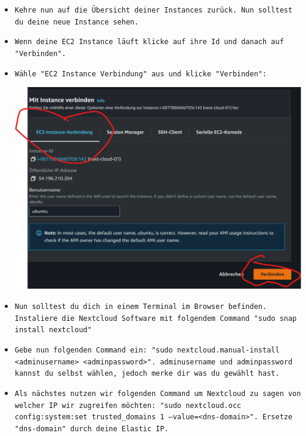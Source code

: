 \documentclass{article}
\begin{document}
\begin{itemize}
\item \texttt{Kehre nun auf die Übersicht deiner Instances zurück. Nun solltest du deine neue Instance sehen.} \\

\item \texttt{Wenn deine EC2 Instance läuft klicke auf ihre Id und danach auf "Verbinden".} \\

\item \texttt{Wähle "EC2 Instance Verbindung" aus und klicke "Verbinden":
} \\

\begin{center}
    \includegraphics[width=13cm]{images/nextcloud_3.png}
\end{center}

\item \texttt{Nun solltest du dich in einem Terminal im Browser befinden. Instaliere die Nextcloud Software mit folgendem Command "sudo snap install nextcloud"} \\

\item \texttt{Gebe nun folgenden Command ein: "sudo nextcloud.manual-install <adminusername> <adminpassword>". adminusername und adminpassword kannst du selbst wählen, jedoch merke dir was du gewählt hast.} \\

\item \texttt{Als nächstes nutzen wir folgenden Command um Nextcloud zu sagen von welcher IP wir zugreifen möchten: "sudo nextcloud.occ \\config:system:set trusted\_domains 1 --value=<dns-domain>". Ersetze "dns-domain" durch deine Elastic IP.} \\


\end{itemize}
\end{document}
